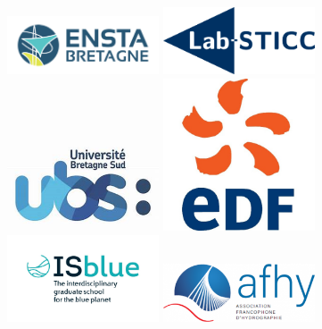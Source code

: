 \begin{titlepage}
\vspace{2cm}
\includegraphics[width=4.5cm]{imgs/logo_ensta.jpg}
\includegraphics[width=4.5cm]{imgs/logo-lab-sticc2.png}
\includegraphics[width=4.5cm]{imgs/logo_ubs_transparent.png} 
\includegraphics[width=4.5cm]{imgs/logo_edf.jpg}
\includegraphics[width=4.5cm]{imgs/logo_isblue.jpg}
\includegraphics[width=4.5cm]{imgs/logo_afhy.png}


\vfill %

\end{titlepage}